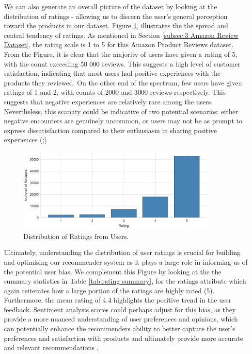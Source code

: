 We can also generate an overall picture of the dataset by looking at the distribution of ratings - allowing us to discern the user's general perception toward the products in our dataset. Figure \ref{fig:ratings distribution}, illustrates the the spread and central tendency of ratings. As mentioned in Section \ref{subsec:3 Amazon Review Dataset}, the rating scale is 1 to 5 for this Amazon Product Reviews dataset. From the Figure, it is clear that the majority of users have given a rating of 5, with the count exceeding 50 000 reviews. This suggests a high level of customer satisfaction, indicating that most users had positive experiences with the products they reviewed. On the other end of the spectrum, few users have given ratings of 1 and 2, with counts of 2000 and 3000 reviews respectively. This suggests that negative experiences are relatively rare among the users. Nevertheless, this scarcity could be indicative of two potential scenarios: either negative encounters are genuinely uncommon, or users may not be as prompt to express dissatisfaction compared to their enthusiasm in sharing positive experiences (\cite{chen2015augmenting};\cite{skalicky2015statistical})

\begin{figure}[h]
  \centering
  \includegraphics[width=0.9\textwidth]{Figures/rating_distribution.pdf} %
  \caption{Distribution of Ratings from Users.}
  \label{fig:ratings distribution}
\end{figure}

Ultimately, understanding the distribution of user ratings is crucial for building and optimising our recommender system as it plays a large role in informing us of the potential user bias. We complement this Figure by looking at the the summary statistics in Table \ref{tab:rating summary}, for the ratings attribute which again reiterates how a large portion of the ratings are highly rated (5). Furthermore, the mean rating of 4.4 highlights the positive trend in the user feedback. Sentiment analysis scores could perhaps adjust for this bias, as they provide a more nuanced understanding of user preferences and opinions, which can potentially enhance the recommenders  ability to better capture the user's preferences and satisfaction with products and ultimately provide more accurate and relevant recommendations \cite{dang2021approach}.

